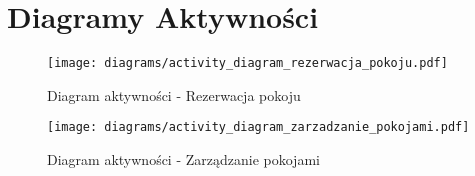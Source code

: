 \section{Diagramy Aktywności}

\begin{figure}[h!]
    \centering
    \texttt{[image: diagrams/activity\_diagram\_rezerwacja\_pokoju.pdf]}
    \caption{Diagram aktywności - Rezerwacja pokoju}
    \label{fig:activity_reservation}
\end{figure}

\begin{figure}[h!]
    \centering
    \texttt{[image: diagrams/activity\_diagram\_zarzadzanie\_pokojami.pdf]}
    \caption{Diagram aktywności - Zarządzanie pokojami}
    \label{fig:activity_room_management}
\end{figure}

